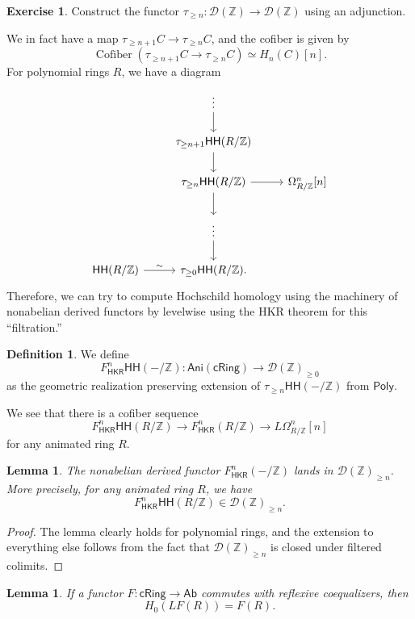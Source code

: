\documentclass[10pt, oneside]{memoir}
\newtheorem{lem}[thm]{Lemma}
\theoremstyle{definition}
\newtheorem{defn}[thm]{Definition}
\newtheorem{exer}[thm]{Exercise}
\theoremstyle{remark}
\theoremstyle{plain}
\theoremstyle{definition}
\theoremstyle{remark}
\newcommand{\Z}{\mathbb{Z}}
\newcommand{\mc}[1]{\mathcal{#1}}
\newcommand{\on}[1]{\operatorname{#1}}
\newcommand{\ms}[1]{\mathsf{#1}}
\newcommand{\1}{\mathbf{1}}
\newcommand{\2}{\mathbf{2}}
\newcommand{\3}{\mathbf{3}}
\newcommand{\HH}{\ms{HH}}
\begin{document}
\begin{exer}
    Construct the functor $\tau_{\geq n} \colon \mc{D}(\Z) \to \mc{D}(\Z)$ using an adjunction.
\end{exer}
We in fact have a map $\tau_{\geq n+1} C \to \tau_{\geq n} C$, and the cofiber is given by
\[ \on{Cofiber}(\tau_{\geq n+1} C \to \tau_{\geq n} C) \simeq H_n(C) [n]. \]
For polynomial rings $R$, we have a diagram
\begin{equation*}
\begin{tikzcd}
    & \vdots \ar{d} \\
    & \tau_{\geq n+1} \HH(R/\Z) \ar{d} \\
    & \tau_{\geq n} \HH(R/\Z) \ar{d} \ar{r} & \Omega^n_{R/\Z}[n] \\
    & \vdots \ar{d} & \\
    \HH(R/\Z) \ar{r}{\sim} & \tau_{\geq 0} \HH(R/\Z).
\end{tikzcd}
\end{equation*}
Therefore, we can try to compute Hochschild homology using the machinery of nonabelian derived functors by levelwise using the HKR theorem for this ``filtration.''

\begin{defn}
    We define
    \[ F^n_{\ms{HKR}} \HH(-/\Z) \colon \ms{Ani}(\ms{cRing}) \to \mc{D}(\Z)_{\geq 0} \]
    as the geometric realization preserving extension of $\tau_{\geq n} \HH(-/\Z)$ from $\ms{Poly}$.
\end{defn}

We see that there is a cofiber sequence
\[ F_{\ms{HKR}}^n \HH(R/\Z) \to F^n_{\ms{HKR}}(R/\Z) \to L \Omega^n_{R/\Z}[n] \]
for any animated ring $R$.

\begin{lem}
    The nonabelian derived functor $F^n_{\ms{HKR}}(-/\Z)$ lands in $\mc{D}(\Z)_{\geq n}$. More precisely, for any animated ring $R$, we have
    \[ F^n_{\ms{HKR}} \HH(R/\Z) \in \mc{D}(\Z)_{\geq n}. \]
\end{lem}

\begin{proof}
    The lemma clearly holds for polynomial rings, and the extension to everything else follows from the fact that $\mc{D}(\Z)_{\geq n}$ is closed under filtered colimits.
\end{proof}

\begin{lem}
    If a functor $F \colon \ms{cRing} \to \ms{Ab}$ commutes with reflexive coequalizers, then
    \[ H_0(LF(R)) = F(R). \]
\end{lem}
\end{document}
